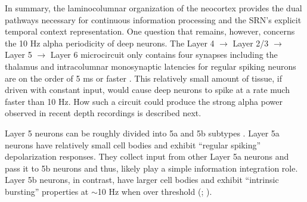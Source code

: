 \documentclass[dwyatte_dissertation.tex]{subfiles}
\begin{document}
In summary, the laminocolumnar organization of the neocortex provides the dual pathways necessary for continuous information processing and the SRN's explicit temporal context representation. One question that remains, however, concerns the 10 Hz alpha periodicity of deep neurons. The Layer 4 $\rightarrow$ Layer 2/3 $\rightarrow$ Layer 5 $\rightarrow$ Layer 6 microcircuit only contains four synapses including the thalamus and intracolumnar monosynaptic latencies for regular spiking neurons are on the order of 5 ms or faster \cite{Armstrong-JamesFoxDas-Gupta92,LumerEdelmanTononi97}. This relatively small amount of tissue, if driven with constant input, would cause deep neurons to spike at a rate much faster than 10 Hz. How such a circuit could produce the strong alpha power observed in recent depth recordings is described next. %



%


Layer 5 neurons can be roughly divided into 5a and 5b subtypes \cite{ThomsonLamy07}. Layer 5a neurons have relatively small cell bodies and exhibit ``regular spiking'' depolarization responses. They collect input from other Layer 5a neurons and pass it to 5b neurons and thus, likely play a simple information integration role. Layer 5b neurons, in contrast, have larger cell bodies and exhibit ``intrinsic bursting'' properties at $\sim$10 Hz when over threshold (; ). %
\end{document}
